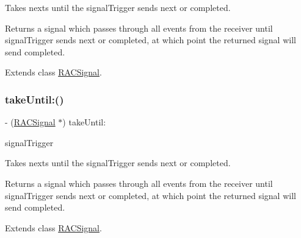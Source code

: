 Takes {\ttfamily next}s until the {\ttfamily signal\+Trigger} sends {\ttfamily next} or {\ttfamily completed}.

Returns a signal which passes through all events from the receiver until {\ttfamily signal\+Trigger} sends {\ttfamily next} or {\ttfamily completed}, at which point the returned signal will send {\ttfamily completed}. 

Extends class \mbox{\hyperlink{interface_r_a_c_signal_afb214e9e69dc34880b306c118b8e56d4}{R\+A\+C\+Signal}}.

\mbox{\label{category_r_a_c_signal_07_operations_08_afb214e9e69dc34880b306c118b8e56d4}} 
\subsubsection{\texorpdfstring{take\+Until\+:()}{takeUntil:()}\hspace{0.1cm}{\footnotesize\ttfamily [3/3]}}
{\footnotesize\ttfamily -\/ (\mbox{\hyperlink{interface_r_a_c_signal}{R\+A\+C\+Signal}} $\ast$) take\+Until\+: \begin{DoxyParamCaption}\item[{(\mbox{\hyperlink{interface_r_a_c_signal}{R\+A\+C\+Signal}} $\ast$)}]{signal\+Trigger }\end{DoxyParamCaption}}

Takes {\ttfamily next}s until the {\ttfamily signal\+Trigger} sends {\ttfamily next} or {\ttfamily completed}.

Returns a signal which passes through all events from the receiver until {\ttfamily signal\+Trigger} sends {\ttfamily next} or {\ttfamily completed}, at which point the returned signal will send {\ttfamily completed}. 

Extends class \mbox{\hyperlink{interface_r_a_c_signal_afb214e9e69dc34880b306c118b8e56d4}{R\+A\+C\+Signal}}.

\mbox{\label{category_r_a_c_signal_07_operations_08_aa8536c9726338e10176997936be011ed}} 

